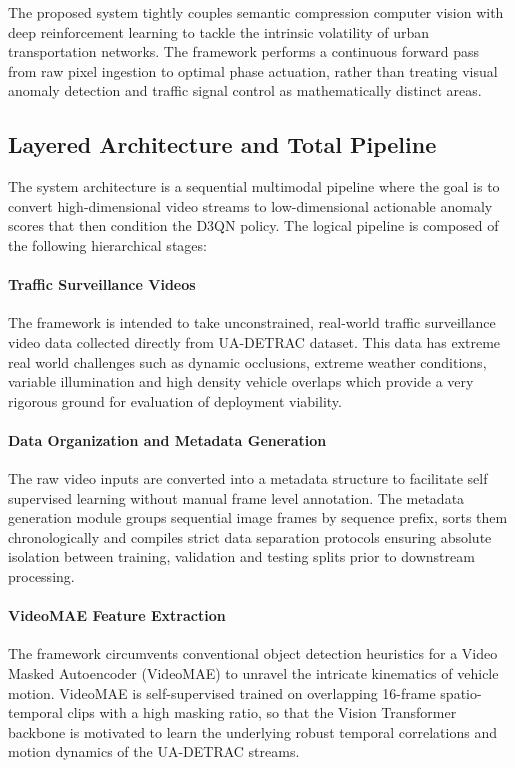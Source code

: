 \documentclass[conference]{IEEEtran}
\begin{document}
\label{sec:proposed_framework}

The proposed system tightly couples semantic compression computer vision with deep reinforcement learning to tackle the intrinsic volatility of urban transportation networks. The framework performs a continuous forward pass from raw pixel ingestion to optimal phase actuation, rather than treating visual anomaly detection and traffic signal control as mathematically distinct areas.

\subsection{Layered Architecture and Total Pipeline}
The system architecture is a sequential multimodal pipeline where the goal is to convert high-dimensional video streams to low-dimensional actionable anomaly scores that then condition the D3QN policy. The logical pipeline is composed of the following hierarchical stages:

\paragraph{Traffic Surveillance Videos}
The framework is intended to take unconstrained, real-world traffic surveillance video data collected directly from UA-DETRAC dataset. This data has extreme real world challenges such as dynamic occlusions, extreme weather conditions, variable illumination and high density vehicle overlaps which provide a very rigorous ground for evaluation of deployment viability.

\paragraph{Data Organization and Metadata Generation}
The raw video inputs are converted into a metadata structure to facilitate self supervised learning without manual frame level annotation. The metadata generation module groups sequential image frames by sequence prefix, sorts them chronologically and compiles strict data separation protocols ensuring absolute isolation between training, validation and testing splits prior to downstream processing.

\paragraph{VideoMAE Feature Extraction}
The framework circumvents conventional object detection heuristics for a Video Masked Autoencoder (VideoMAE) to unravel the intricate kinematics of vehicle motion. VideoMAE is self-supervised trained on overlapping 16-frame spatio-temporal clips with a high masking ratio, so that the Vision Transformer backbone is motivated to learn the underlying robust temporal correlations and motion dynamics of the UA-DETRAC streams.
\end{document}
